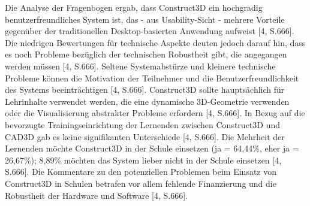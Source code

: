\documentclass[deutsch]{llncs}
\begin{document}
Die Analyse der Fragenbogen ergab, dass Construct3D ein hochgradig benutzerfreundliches System ist, das - aus Usability-Sicht - mehrere Vorteile gegenüber der traditionellen Desktop-basierten Anwendung aufweist [4, S.666]. Die niedrigen Bewertungen für technische Aspekte deuten jedoch darauf hin, dass es noch Probleme bezüglich der technischen Robustheit gibt, die angegangen werden müssen [4, S.666]. Seltene Systemabstürze und kleinere technische Probleme können die Motivation der Teilnehmer und die Benutzerfreundlichkeit des Systems beeinträchtigen [4, S.666]. Construct3D sollte hauptsächlich für Lehrinhalte verwendet werden, die eine dynamische 3D-Geometrie verwenden oder die Visualisierung abstrakter Probleme erfordern [4, S.666]. In Bezug auf die bevorzugte Trainingseinrichtung der Lernenden zwischen Construct3D und CAD3D gab es keine signifikanten Unterschiede [4, S.666]. Die Mehrheit der Lernenden möchte Construct3D in der Schule einsetzen (ja = 64,44\%, eher ja = 26,67\%); 8,89\% möchten das System lieber nicht in der Schule einsetzen [4, S.666].  Die Kommentare zu den potenziellen Problemen beim Einsatz von Construct3D in Schulen betrafen vor allem fehlende Finanzierung und die Robustheit der Hardware und Software [4, S.666].\\
\end{document}
